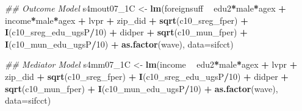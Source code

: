 \documentclass[
]{article}
\newenvironment{Shaded}{\begin{snugshade}}{\end{snugshade}}
\newcommand{\CommentTok}[1]{\textcolor[rgb]{0.56,0.35,0.01}{\textit{#1}}}
\newcommand{\DataTypeTok}[1]{\textcolor[rgb]{0.13,0.29,0.53}{#1}}
\newcommand{\DecValTok}[1]{\textcolor[rgb]{0.00,0.00,0.81}{#1}}
\newcommand{\KeywordTok}[1]{\textcolor[rgb]{0.13,0.29,0.53}{\textbf{#1}}}
\newcommand{\NormalTok}[1]{#1}
\newcommand{\OperatorTok}[1]{\textcolor[rgb]{0.81,0.36,0.00}{\textbf{#1}}}
\newcommand{\StringTok}[1]{\textcolor[rgb]{0.31,0.60,0.02}{#1}}
\begin{document}
\begin{Shaded}
\begin{Highlighting}[]
\CommentTok{## Outcome Model }
\NormalTok{s4mout07_1C <-}\StringTok{ }\KeywordTok{lm}\NormalTok{(foreignsuff  }\OperatorTok{~}\StringTok{ }\NormalTok{edu2}\OperatorTok{*}\NormalTok{male}\OperatorTok{*}\NormalTok{agex }\OperatorTok{+}\StringTok{ }\NormalTok{income}\OperatorTok{*}\NormalTok{male}\OperatorTok{*}\NormalTok{agex }\OperatorTok{+}\StringTok{ }\NormalTok{lvpr }\OperatorTok{+}\StringTok{  }
\StringTok{                    }\NormalTok{zip_did }\OperatorTok{+}\StringTok{ }\KeywordTok{sqrt}\NormalTok{(c10_sreg_fper) }\OperatorTok{+}\StringTok{ }\KeywordTok{I}\NormalTok{(c10_sreg_edu_ugsP}\OperatorTok{/}\DecValTok{10}\NormalTok{) }\OperatorTok{+}\StringTok{ }
\StringTok{                    }\NormalTok{didper }\OperatorTok{+}\StringTok{ }\KeywordTok{sqrt}\NormalTok{(c10_mun_fper) }\OperatorTok{+}\StringTok{ }\KeywordTok{I}\NormalTok{(c10_mun_edu_ugsP}\OperatorTok{/}\DecValTok{10}\NormalTok{) }\OperatorTok{+}\StringTok{ }
\StringTok{                    }\KeywordTok{as.factor}\NormalTok{(wave), }\DataTypeTok{data=}\NormalTok{sifcct)}

\CommentTok{## Mediator Model}
\NormalTok{s4mm07_1C <-}\StringTok{ }\KeywordTok{lm}\NormalTok{(income  }\OperatorTok{~}\StringTok{ }\NormalTok{edu2}\OperatorTok{*}\NormalTok{male}\OperatorTok{*}\NormalTok{agex }\OperatorTok{+}\StringTok{ }\NormalTok{lvpr }\OperatorTok{+}\StringTok{  }
\StringTok{                  }\NormalTok{zip_did }\OperatorTok{+}\StringTok{ }\KeywordTok{sqrt}\NormalTok{(c10_sreg_fper) }\OperatorTok{+}\StringTok{ }\KeywordTok{I}\NormalTok{(c10_sreg_edu_ugsP}\OperatorTok{/}\DecValTok{10}\NormalTok{) }\OperatorTok{+}\StringTok{ }
\StringTok{                  }\NormalTok{didper }\OperatorTok{+}\StringTok{ }\KeywordTok{sqrt}\NormalTok{(c10_mun_fper) }\OperatorTok{+}\StringTok{ }\KeywordTok{I}\NormalTok{(c10_mun_edu_ugsP}\OperatorTok{/}\DecValTok{10}\NormalTok{) }\OperatorTok{+}\StringTok{ }
\StringTok{                  }\KeywordTok{as.factor}\NormalTok{(wave), }\DataTypeTok{data=}\NormalTok{sifcct)}


\end{Highlighting}
\end{Shaded}
\end{document}
